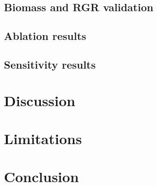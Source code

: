 \documentclass[a4paper,fleqn]{cas-dc}
\begin{document}
\subsection{Biomass and RGR validation}

\subsection{Ablation results}

\subsection{Sensitivity results}

\section{Discussion}
\label{sec:discussion}


\section{Limitations}
\label{sec:limitations}


\section{Conclusion}
\label{sec:conclusion}
\end{document}
